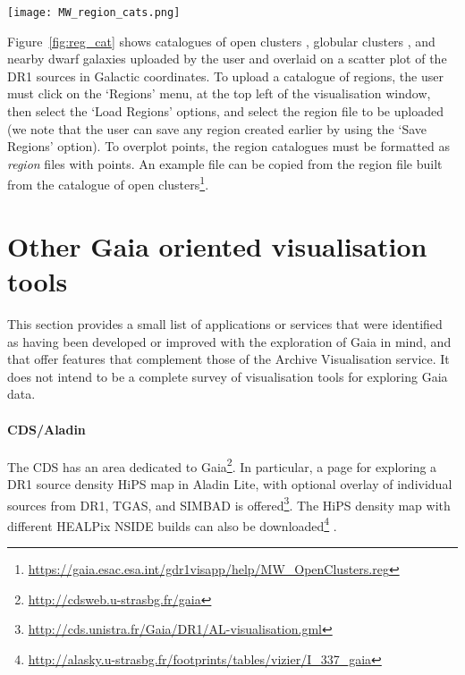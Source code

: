 \documentclass[longauth, final]{aa}
\begin{document}
\begin{figure*}[!htbp]
\centering
    \texttt{[image: MW\_region\_cats.png]}
  \caption{User catalogue of open clusters, globular clusters, and nearby dwarf galaxies overlaid on a scatter plot of the DR1 sources in galactic coordinates.}\label{fig:reg_cat}
\end{figure*}

Figure~\ref{fig:reg_cat} shows catalogues of open clusters \citep[][ Version 3.5, Jan 2016]{2002A&A...389..871D}, globular clusters \citep{1996AJ....112.1487H}, and nearby dwarf galaxies \citep{2012AJ....144....4M} uploaded by the user and overlaid on a scatter plot of the DR1 sources in Galactic coordinates. To upload a catalogue of regions, the user must click on the `Regions' menu, at the top left  of the visualisation window,  then select the `Load Regions' options, and select the region file to be uploaded (we note that the user can save any region  created earlier by using the `Save Regions' option). To overplot points, the region catalogues must be formatted as \emph{region} files with points. An example file can be copied from the region file built from the catalogue of open clusters\footnote{\url{https://gaia.esac.esa.int/gdr1visapp/help/MW_OpenClusters.reg}}. 



\section{Other Gaia oriented visualisation tools}
\label{sec:other}

This section provides a small list of applications or services that were identified as having been developed or improved with the exploration of Gaia in mind, and that offer features that complement those of the Archive Visualisation service. It does not intend to be a complete survey of visualisation tools for exploring Gaia data. 

\paragraph{CDS/Aladin} The CDS has an area dedicated to Gaia\footnote{\url{http://cdsweb.u-strasbg.fr/gaia}}. In particular, a page for exploring a DR1 source density HiPS map in Aladin Lite, with optional overlay of individual sources from DR1, TGAS, and SIMBAD is offered\footnote{\url{http://cds.unistra.fr/Gaia/DR1/AL-visualisation.gml}}. The HiPS density map with different HEALPix NSIDE builds can also be downloaded\footnote{\url{http://alasky.u-strasbg.fr/footprints/tables/vizier/I_337_gaia}} .
\end{document}
